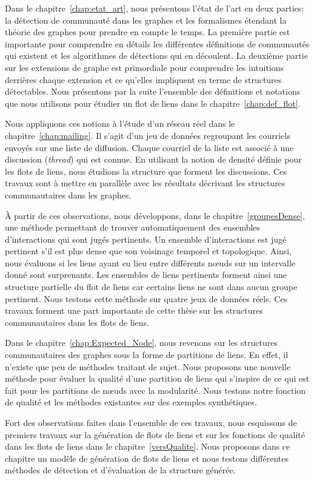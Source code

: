 Dans le chapitre~\ref{chap:etat_art}, nous présentons l'état de l'art en deux parties: la détection de communauté dans les graphes et les formalismes étendant la théorie des graphes pour prendre en compte le temps.
La première partie est importante pour comprendre en détails les différentes définitions de communautés qui existent et les algorithmes de détections qui en découlent.
La deuxième partie sur les extensions de graphe est primordiale pour comprendre les intuitions derrières chaque extension et ce qu'elles impliquent en terme de structures détectables.
Nous présentons par la suite l'ensemble des définitions et notations que nous utilisons pour étudier un flot de liens dans le chapitre~\ref{chap:def_flot}.

Nous appliquons ces notions à l'étude d'un réseau réel dans le chapitre~\ref{chap:mailing}.
Il s'agit d'un jeu de données regroupant les courriels envoyés sur une liste de diffusion.
Chaque courriel de la liste est associé à une discussion (\emph{thread}) qui est connue.
En utilisant la notion de densité définie pour les flots de liens, nous étudions la structure que forment les discussions.
Ces travaux sont à mettre en parallèle avec les résultats décrivant les structures communautaires dans les graphes.


\`A partir de ces observations, nous développons, dans le chapitre~\ref{groupesDense}, une méthode permettant de trouver automatiquement des ensembles d'interactions qui sont jugés pertinents.
Un ensemble d'interactions est jugé pertinent s’il est plus dense que son voisinage temporel et topologique.
Ainsi, nous évaluons si les liens ayant eu lieu entre différents n\oe uds sur un intervalle donné sont surprenants.
Les  ensembles de liens pertinents forment ainsi une structure partielle du flot de liens car certains liens ne sont dans aucun groupe pertinent.
Nous testons cette méthode sur quatre jeux de données réels.
Ces travaux forment une part importante de cette thèse sur les structures communautaires dans les flots de liens.

Dans le chapitre~\ref{chap:Expected_Node}, nous revenons sur les structures communautaires des graphes sous la forme de partitions de liens.
En effet, il n'existe que peu de méthodes traitant de sujet.
Nous proposons une nouvelle méthode pour évaluer la qualité d'une partition de liens qui s'inspire de ce qui est fait pour les partitions de n\oe uds avec la modularité.
Nous testons notre fonction de qualité et les méthodes existantes sur des exemples synthétiques.

Fort des observations faites dans l'ensemble de ces travaux, nous esquissons de premiers travaux sur la génération de flots de liens et sur les fonctions de qualité dans les flots de liens dans le chapitre~\ref{versQualite}.
Nous proposons dans ce chapitre un modèle de génération de flots de liens et nous testons différentes méthodes de détection et d'évaluation de la structure générée.


